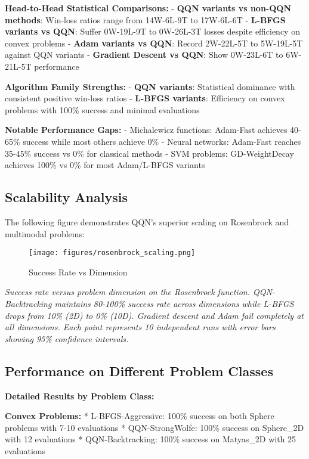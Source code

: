 \textbf{Head-to-Head Statistical Comparisons:}
- \textbf{QQN variants vs non-QQN methods}: Win-loss ratios range from 14W-6L-9T to 17W-6L-6T
- \textbf{L-BFGS variants vs QQN}: Suffer 0W-19L-9T to 0W-26L-3T losses despite efficiency on convex problems
- \textbf{Adam variants vs QQN}: Record 2W-22L-5T to 5W-19L-5T against QQN variants
- \textbf{Gradient Descent vs QQN}: Show 0W-23L-6T to 6W-21L-5T performance

\textbf{Algorithm Family Strengths:}
- \textbf{QQN variants}: Statistical dominance with consistent positive win-loss ratios
- \textbf{L-BFGS variants}: Efficiency on convex problems with 100\% success and minimal evaluations

\textbf{Notable Performance Gaps:}
- Michalewicz functions: Adam-Fast achieves 40-65\% success while most others achieve 0\%
- Neural networks: Adam-Fast reaches 35-45\% success vs 0\% for classical methods
- SVM problems: GD-WeightDecay achieves 100\% vs 0\% for most Adam/L-BFGS variants

\hypertarget{scalability-analysis}{%
\subsection{Scalability Analysis}\label{scalability-analysis}}

The following figure demonstrates QQN's superior scaling on Rosenbrock and multimodal problems:

\begin{figure}
\centering
\texttt{[image: figures/rosenbrock\_scaling.png]}
\caption{Success Rate vs Dimension}
\end{figure}

\emph{Success rate versus problem dimension on the Rosenbrock function. QQN-Backtracking maintains 80-100\% success rate across dimensions while L-BFGS drops from 10\% (2D) to 0\% (10D). Gradient descent and Adam fail completely at all dimensions. Each point represents 10 independent runs with error bars showing 95\% confidence intervals.}

\hypertarget{performance-on-different-problem-classes}{%
\subsection{Performance on Different Problem Classes}\label{performance-on-different-problem-classes}}

\textbf{Detailed Results by Problem Class:}

\textbf{Convex Problems:}
* L-BFGS-Aggressive: 100\% success on both Sphere problems with 7-10 evaluations
* QQN-StrongWolfe: 100\% success on Sphere\_2D with 12 evaluations
* QQN-Backtracking: 100\% success on Matyas\_2D with 25 evaluations

